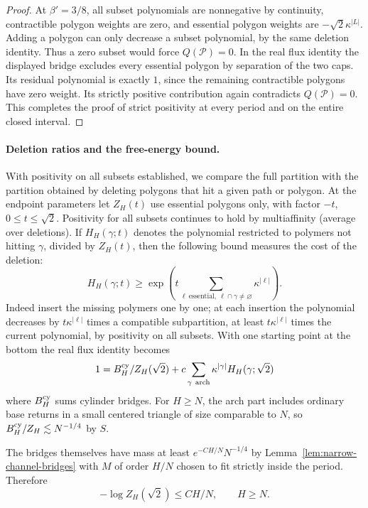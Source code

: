 \begin{proof}
At $\beta'=3/8$, all subset polynomials are nonnegative by continuity, contractible polygon weights are zero, and essential polygon weights are $-\sqrt2\kappa^{|L|}$. Adding a polygon can only decrease a subset polynomial, by the same deletion identity. Thus a zero subset would force $Q(\mathcal P)=0$. In the real flux identity the displayed bridge excludes every essential polygon by separation of the two caps. Its residual polynomial is exactly $1$, since the remaining contractible polygons have zero weight. Its strictly positive contribution again contradicts $Q(\mathcal P)=0$. This completes the proof of strict positivity at every period and on the entire closed interval.
\end{proof}

\paragraph{Deletion ratios and the free-energy bound.}
With positivity on all subsets established, we compare the full partition with the partition obtained by deleting polygons that hit a given path or polygon. At the endpoint parameters let \(Z_H(t)\) use essential polygons only, with factor \(-t\), \(0\le t\le\sqrt2\). Positivity for all subsets continues to hold by multiaffinity (average over deletions). If \(H_H(\gamma;t)\) denotes the polynomial restricted to polymers not hitting \(\gamma\), divided by \(Z_H(t)\), then the following bound measures the cost of the deletion:
\begin{equation}\label{eq:cylinder-deletion-ratio}
 H_H(\gamma;t)\ge\exp\left(t\sum_{\ell\ \mathrm{essential},\ \ell\cap\gamma\ne\varnothing}
                 \kappa^{|\ell|}\right).
\end{equation}
Indeed insert the missing polymers one by one; at each insertion the polynomial decreases by \(t\kappa^{|\ell|}\) times a compatible subpartition, at least \(t\kappa^{|\ell|}\) times the current polynomial, by positivity on all subsets. With one starting point at the bottom the real flux identity becomes
\[
 1=B^{\rm cy}_H/Z_H(\sqrt2)+ c\sum_{\gamma\ \mathrm{arch}}\kappa^{|\gamma|} H_H(\gamma;\sqrt2)
\]
where \(B^{\rm cy}_H\) sums cylinder bridges. For \(H\ge N\), the arch part includes ordinary base returns in a small centered triangle of size comparable to \(N\), so \(B^{\rm cy}_H/Z_H\lesssim N^{-1/4}\) by \(S\).

The bridges themselves have mass at least \(e^{-C H/N}N^{-1/4}\) by Lemma~\ref{lem:narrow-channel-bridges} with \(M\) of order \(H/N\) chosen to fit strictly inside the period. Therefore
\begin{equation}\label{eq:cylinder-free-energy}
 -\log Z_H(\sqrt2)\le CH/N,\qquad H\ge N.
\end{equation}


